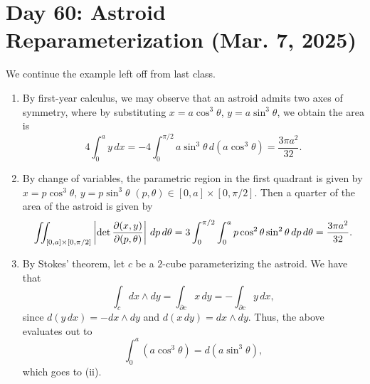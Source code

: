 \section{Day 60: Astroid Reparameterization (Mar. 7, 2025)}
We continue the example left off from last class.
\begin{enumerate}[label=(\roman*)]
    \item By first-year calculus, we may observe that an astroid admits two axes of symmetry, where by substituting $x = a \cos^3 \theta$, $y = a \sin^3 \theta$, we obtain the area is
    \[ 4 \int_0^a y \, dx = -4 \int_0^{\pi/2} a \sin^3 \theta \, d(a \cos^3 \theta) = \frac{3\pi a^2}{32}. \]
    \item By change of variables, the parametric region in the first quadrant is given by $x = p \cos^3 \theta$, $y = p \sin^3 \theta$ $(p, \theta) \in [0, a] \times [0, \pi/2]$. Then a quarter of the area of the astroid is given by
    \[ \iint_{[0, a] \times [0, \pi/2]} \left\lvert \det \frac{\partial(x, y)}{\partial(p, \theta)} \right\rvert \, dp \, d\theta = 3 \int_0^{\pi/2} \int_0^a p \cos^2 \theta \sin^2 \theta \, dp \, d\theta = \frac{3\pi a^2}{32}. \]
    \item By Stokes' theorem, let $c$ be a $2$-cube parameterizing the astroid. We have that
    \[ \int_c dx \wedge dy = \int_{\partial c} x \, dy = - \int_{\partial c} y \, dx, \]
    since $d(y \, dx) = -dx \wedge dy$ and $d(x \, dy) = dx \wedge dy$. Thus, the above evaluates out to
    \[ \int_0^a (a \cos^3 \theta) = d(a \sin^3 \theta), \]
    which goes to (ii).
\end{enumerate}